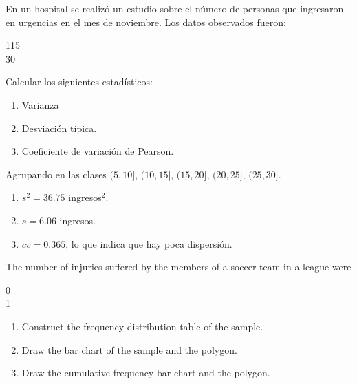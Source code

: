 {En un hospital se realizó un estudio sobre el número de personas que ingresaron en urgencias en el mes de noviembre. Los datos observados fueron:
\begin{center}
115               \\
30              
\end{center}
Calcular los siguientes estadísticos:
\begin{enumerate}
\item Varianza
\item Desviación típica.
\item Coeficiente de variación de Pearson.
\end{enumerate}
}
{
Agrupando en las clases $(5,10]$, $(10,15]$, $(15,20]$, $(20,25]$, $(25,30]$.
\begin{enumerate}
\item $s^2 = 36.75$ ingresos$^2$.
\item $s=6.06$ ingresos.
\item $cv=0.365$, lo que indica que hay poca dispersión.
\end{enumerate}
}
{}


{The number of injuries suffered by the members of a soccer team in a league were
\begin{center}
0            \\
1           
\end{center}

\begin{enumerate}
\item Construct the frequency distribution table of the sample.
\item Draw the bar chart of the sample and the polygon.
\item Draw the cumulative frequency bar chart and the polygon.
\end{enumerate}
}
{
}
{}


